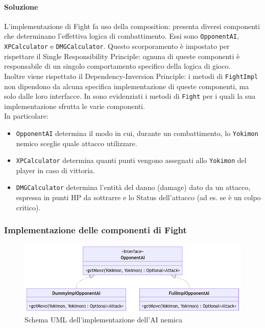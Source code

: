 \documentclass[a4paper,12pt]{report}
\begin{document}
\paragraph{Soluzione} L’implementazione di Fight fa uso della composition: presenta diversi componenti che determinano l’effettiva logica di combattimento. Essi sono \texttt{OpponentAI}, \texttt{XPCalculator} e \texttt{DMGCalculator}. 
%
Questo scorporamento è impostato per rispettare il Single Responsibility Principle: ognuna di queste componenti è responsabile di un singolo comportamento specifico della logica di gioco. \\
%
Inoltre viene rispettato il Dependency-Inversion Principle: i metodi di \texttt{FightImpl} non dipendono da alcuna specifica implementazione di queste componenti, ma solo dalle loro interfacce.
%
In  sono evidenziati i metodi di \texttt{Fight} per i quali la sua implementazione sfrutta le varie componenti. \\
In particolare: 
\begin{itemize}
    \item \texttt{OpponentAI} determina il modo in cui, durante un combattimento, lo \texttt{Yokimon} nemico sceglie quale attacco utilizzare.
    \item \texttt{XPCalculator} determina quanti punti vengono assegnati allo \texttt{Yokimon} del player in caso di vittoria.
    \item \texttt{DMGCalculator} determina l’entità del danno (damage) dato da un attacco, espressa in punti HP da sottrarre e lo Status dell’attacco (ad es. se è un colpo critico).
\end{itemize}
\subsubsection{Implementazione delle componenti di Fight}
\begin{figure}[H]
\centering{}
\includegraphics[width=1.0\columnwidth]{images/uml-opponentai.png}
\caption{Schema UML dell'implementazione dell'AI nemica}
\label{img:uml-opponentai}
\end{figure}
\end{document}
